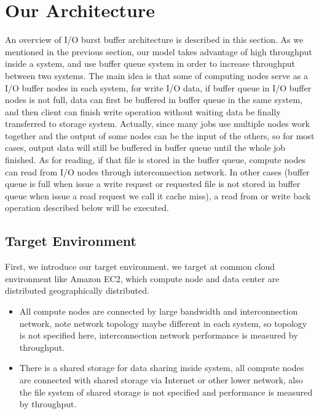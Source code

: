 \section{Our Architecture}
\label{sec:architecture}

An overview of I/O burst buffer architecture is described in this section.
As we mentioned in the previous section, our model takes advantage of high throughput inside a system, and use buffer queue system in order to increase throughput between two systems.
The main idea is that some of computing nodes serve as a I/O buffer nodes in each system, for write I/O data, if buffer queue in I/O buffer nodes is not full, data can first be buffered in buffer queue in the same system, and then client can finish write operation without waiting data be finally transferred to storage system.
Actually, since many jobs use multiple nodes work together and the output of some nodes can be the
input of the others, so for most cases, output data will still be buffered in buffer queue until the whole job finished.
As for reading, if that file is stored in the buffer queue, compute nodes can read from I/O nodes through interconnection network.
In other cases (buffer queue is full when issue a write request or requested file is not stored in buffer queue when issue a read request we call it cache miss), a read from or write back operation described below will be executed. 

\subsection{Target Environment}
First, we introduce our target environment.
we target at common cloud environment like Amazon EC2, which compute node and data center are distributed geographically distributed.

\begin{itemize}
	\item All compute nodes are connected by large bandwidth and interconnection network, note network topology maybe different in each system, so topology is not specified here, interconnection network performance is measured by throughput.
	\item There is a shared storage for data sharing inside system, all compute nodes are connected
	with shared storage via Internet or other lower network, also the file system of shared storage is not specified and performance is measured by throughput.
\end{itemize}

